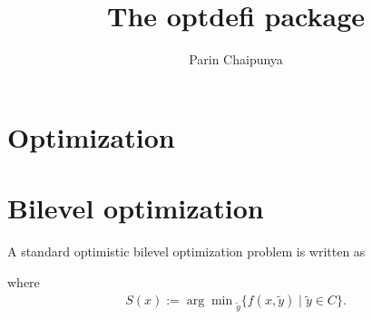 \documentclass{article}
\title{The {\ttfamily optdefi} package}
\author{Parin Chaipunya}
\begin{document}
\maketitle

\section{Optimization}
\lipsum[1]
\begin{optim}
\end{optim}
\lipsum[2]

\section{Bilevel optimization}

A standard optimistic bilevel optimization problem is written as
\begin{optim*}
\end{optim*}
where
\begin{align*}
  S(x) := {\arg\min}_{\tilde{y}} \{ f(x,\tilde{y}) \mid \tilde{y} \in C \}.
\end{align*}
\end{document}
